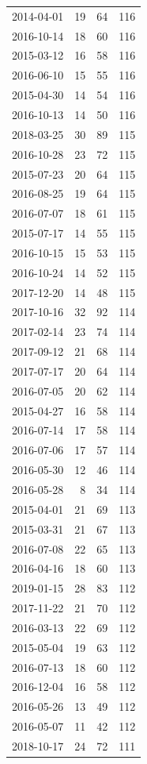 \begin{tabular}{lrrr}
2014-04-01 & 19 & 64 & 116 \\
2016-10-14 & 18 & 60 & 116 \\
2015-03-12 & 16 & 58 & 116 \\
2016-06-10 & 15 & 55 & 116 \\
2015-04-30 & 14 & 54 & 116 \\
2016-10-13 & 14 & 50 & 116 \\
2018-03-25 & 30 & 89 & 115 \\
2016-10-28 & 23 & 72 & 115 \\
2015-07-23 & 20 & 64 & 115 \\
2016-08-25 & 19 & 64 & 115 \\
2016-07-07 & 18 & 61 & 115 \\
2015-07-17 & 14 & 55 & 115 \\
2016-10-15 & 15 & 53 & 115 \\
2016-10-24 & 14 & 52 & 115 \\
2017-12-20 & 14 & 48 & 115 \\
2017-10-16 & 32 & 92 & 114 \\
2017-02-14 & 23 & 74 & 114 \\
2017-09-12 & 21 & 68 & 114 \\
2017-07-17 & 20 & 64 & 114 \\
2016-07-05 & 20 & 62 & 114 \\
2015-04-27 & 16 & 58 & 114 \\
2016-07-14 & 17 & 58 & 114 \\
2016-07-06 & 17 & 57 & 114 \\
2016-05-30 & 12 & 46 & 114 \\
2016-05-28 & 8 & 34 & 114 \\
2015-04-01 & 21 & 69 & 113 \\
2015-03-31 & 21 & 67 & 113 \\
2016-07-08 & 22 & 65 & 113 \\
2016-04-16 & 18 & 60 & 113 \\
2019-01-15 & 28 & 83 & 112 \\
2017-11-22 & 21 & 70 & 112 \\
2016-03-13 & 22 & 69 & 112 \\
2015-05-04 & 19 & 63 & 112 \\
2016-07-13 & 18 & 60 & 112 \\
2016-12-04 & 16 & 58 & 112 \\
2016-05-26 & 13 & 49 & 112 \\
2016-05-07 & 11 & 42 & 112 \\
2018-10-17 & 24 & 72 & 111 \\

\end{tabular}
